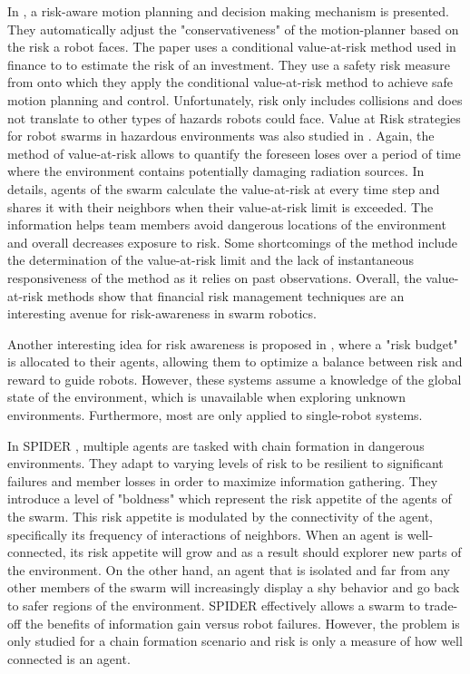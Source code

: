 In \cite{hakobyan2019risk}, a risk-aware motion planning and decision making mechanism is presented. They automatically adjust the "conservativeness" of the motion-planner based on the risk a robot faces. The paper uses a conditional value-at-risk method used in finance to to estimate the risk of an investment. They use a safety risk measure from \cite{samuelson2018safety} onto which they apply the conditional value-at-risk method to achieve safe motion planning and control. Unfortunately, risk only includes collisions and does not translate to other types of hazards robots could face. Value at Risk strategies for robot swarms in hazardous environments was also studied in \cite{hunt2021value}. Again, the method of value-at-risk allows to quantify the foreseen loses over a period of time where the environment contains potentially damaging radiation sources. In details, agents of the swarm calculate the value-at-risk at every time step and shares it with their neighbors when their value-at-risk limit is exceeded. The information helps team members avoid dangerous locations of the environment and overall decreases exposure to risk. Some shortcomings of the method include the determination of the value-at-risk limit and the lack of instantaneous responsiveness of the method as it relies on past observations. Overall, the value-at-risk methods show that financial risk management techniques are an interesting avenue for risk-awareness in swarm robotics.

Another interesting idea for risk awareness is proposed in \cite{ono2008efficient,vitus2011feedback}, where a "risk budget" is allocated to their agents, allowing them to optimize a balance between risk and reward to guide robots. However, these systems assume a knowledge of the global state of the environment, which is unavailable when exploring unknown environments. Furthermore, most are only applied to single-robot systems. 

In SPIDER \cite{hunt2020spider}, multiple agents are tasked with chain formation in dangerous environments. They adapt to varying levels of risk to be resilient to significant failures and member losses in order to maximize information gathering. They introduce a level of "boldness" which represent the risk appetite of the agents of the swarm. This risk appetite is modulated by the connectivity of the agent, specifically its frequency of interactions of neighbors. When an agent is well-connected, its risk appetite will grow and as a result should explorer new parts of the environment. On the other hand, an agent that is isolated and far from any other members of the swarm will increasingly display a shy behavior and go back to safer regions of the environment. SPIDER effectively allows a swarm to trade-off the benefits of information gain versus robot failures. However, the problem is only studied for a chain formation scenario and risk is only a measure of how well connected is an agent.  






